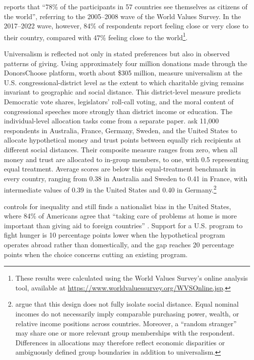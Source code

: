 \documentclass[11pt,a4paper]{article}
\begin{document}
\citet{bayram_2015} reports that ``78\% of the participants in 57 countries see themselves as citizens of the world'', referring to the 2005--2008 wave of the World Values Survey. In the 2017--2022 wave, however, 84\% of respondents report feeling close or very close to their country, compared with 47\% feeling close to the world\footnote{These results were calculated using the World Values Survey's online analysis tool, available at \url{https://www.worldvaluessurvey.org/WVSOnline.jsp}.}. 

Universalism is reflected not only in stated preferences but also in observed patterns of giving. Using approximately four million donations made through the DonorsChoose platform, worth about \$305 million, \citet{enke_universalism_2024} measure universalism at the U.S. congressional-district level as the extent to which charitable giving remains invariant to geographic and social distance. This district-level measure predicts Democratic vote shares, legislators' roll-call voting, and the moral content of congressional speeches more strongly than district income or education. The individual-level allocation tasks come from a separate paper. \citet{enke_moral_2023} ask 11,000 respondents in Australia, France, Germany, Sweden, and the United States to allocate hypothetical money and trust points between equally rich recipients at different social distances. Their composite measure ranges from zero, when all money and trust are allocated to in-group members, to one, with 0.5 representing equal treatment. Average scores are below this equal-treatment benchmark in every country, ranging from 0.38 in Australia and Sweden to 0.41 in France, with intermediate values of 0.39 in the United States and 0.40 in Germany.\footnote{\citet{boyer-kassem_how_2026} argue that this design does not fully isolate social distance. Equal nominal incomes do not necessarily imply comparable purchasing power, wealth, or relative income positions across countries. Moreover, a ``random stranger'' may share one or more relevant group memberships with the respondent. Differences in allocations may therefore reflect economic disparities or ambiguously defined group boundaries in addition to universalism.}

\citet{prather_2013} controls for inequality and still finds a nationalist bias in the United States, where 84\% of Americans agree that ``taking care of problems at home is more important than giving aid to foreign countries'' \citep{PIPA2001}. Support for a U.S. program to fight hunger is 10 percentage points lower when the hypothetical program operates abroad rather than domestically, and the gap reaches 20 percentage points when the choice concerns cutting an existing program.
\end{document}
